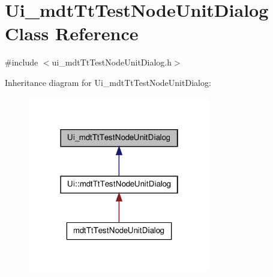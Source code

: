 \hypertarget{class_ui__mdt_tt_test_node_unit_dialog}{\section{Ui\-\_\-mdt\-Tt\-Test\-Node\-Unit\-Dialog Class Reference}
\label{class_ui__mdt_tt_test_node_unit_dialog}
}


{\ttfamily \#include $<$ui\-\_\-mdt\-Tt\-Test\-Node\-Unit\-Dialog.\-h$>$}



Inheritance diagram for Ui\-\_\-mdt\-Tt\-Test\-Node\-Unit\-Dialog\-:
\nopagebreak
\begin{figure}[H]
\begin{center}
\leavevmode
\includegraphics[width=226pt]{class_ui__mdt_tt_test_node_unit_dialog__inherit__graph}
\end{center}
\end{figure}


